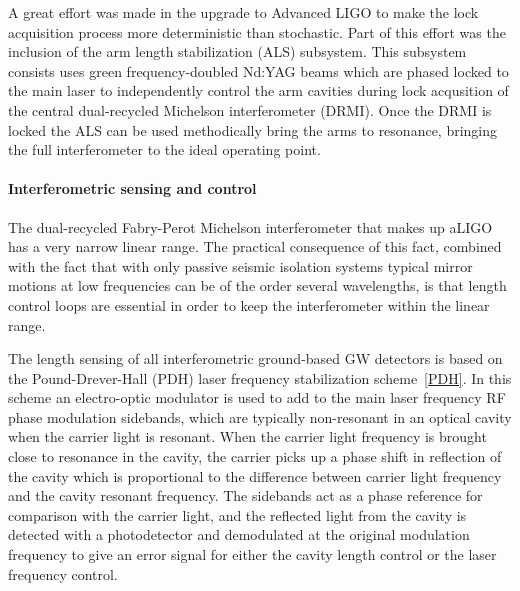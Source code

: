 A great effort was made in the upgrade to Advanced LIGO to make the lock acquisition process more deterministic than 
stochastic. Part of this effort was the inclusion of the arm length stabilization (ALS) subsystem. This subsystem consists uses 
green frequency-doubled Nd:YAG beams which are phased locked to the main laser to independently control the arm cavities during 
lock acqusition of the central dual-recycled Michelson interferometer (DRMI). Once the DRMI is locked the ALS can be used 
methodically bring the arms to resonance, bringing the full interferometer to the ideal operating point.

\paragraph*{Interferometric sensing and control}
The dual-recycled Fabry-Perot Michelson interferometer that makes up aLIGO has a very narrow linear range. 
The practical consequence of this fact, combined with the fact that with only passive seismic isolation systems typical 
mirror motions at low frequencies can be of the order several wavelengths, is that length control loops are essential in order 
to keep the interferometer within the linear range. 

The length sensing of all interferometric ground-based GW detectors is based on the Pound-Drever-Hall (PDH) laser 
frequency stabilization scheme~\ref{PDH}. 
In this scheme an electro-optic modulator is used to add to the main laser frequency RF phase modulation sidebands, 
which are typically non-resonant in an optical cavity when the carrier light is resonant.
When the carrier light frequency is brought close to resonance in the cavity, 
the carrier picks up a phase shift in reflection of the cavity which is proportional to the difference between carrier light 
frequency and the cavity resonant frequency. The sidebands act as a phase reference for comparison with the 
carrier light, and the reflected light 
from the cavity is detected with a photodetector and demodulated at the original modulation frequency to give an error 
signal for either the cavity length control or the laser frequency control. 

